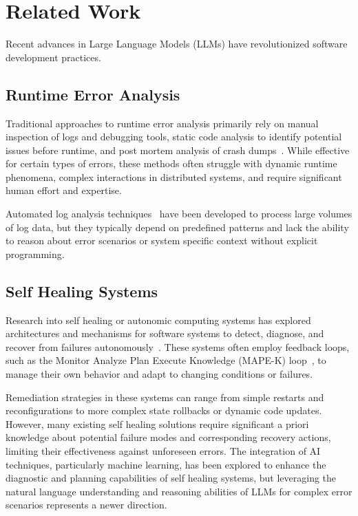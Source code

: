 \section{Related Work}\label{sec:related-work}
Recent advances in Large Language Models (LLMs) have revolutionized software development practices.

\subsection{Runtime Error Analysis}
Traditional approaches to runtime error analysis primarily rely on manual inspection of logs and debugging tools, static code analysis to identify potential issues before runtime, and post mortem analysis of crash dumps~\cite{debugging_techniques_survey_2017, static_analysis_overview_2015}. While effective for certain types of errors, these methods often struggle with dynamic runtime phenomena, complex interactions in distributed systems, and require significant human effort and expertise. 

Automated log analysis techniques~\cite{log_analysis_survey_2016} have been developed to process large volumes of log data, but they typically depend on predefined patterns and lack the ability to reason about error scenarios or system specific context without explicit programming.

\subsection{Self Healing Systems}
Research into self healing or autonomic computing systems has explored architectures and mechanisms for software systems to detect, diagnose, and recover from failures autonomously~\cite{autonomic_computing_overview_2004, self_healing_survey_2012}. These systems often employ feedback loops, such as the Monitor Analyze Plan Execute Knowledge (MAPE-K) loop~\cite{mapek2003}, to manage their own behavior and adapt to changing conditions or failures.

Remediation strategies in these systems can range from simple restarts and reconfigurations to more complex state rollbacks or dynamic code updates. However, many existing self healing solutions require significant a priori knowledge about potential failure modes and corresponding recovery actions, limiting their effectiveness against unforeseen errors. The integration of AI techniques, particularly machine learning, has been explored to enhance the diagnostic and planning capabilities of self healing systems, but leveraging the natural language understanding and reasoning abilities of LLMs for complex error scenarios represents a newer direction.

